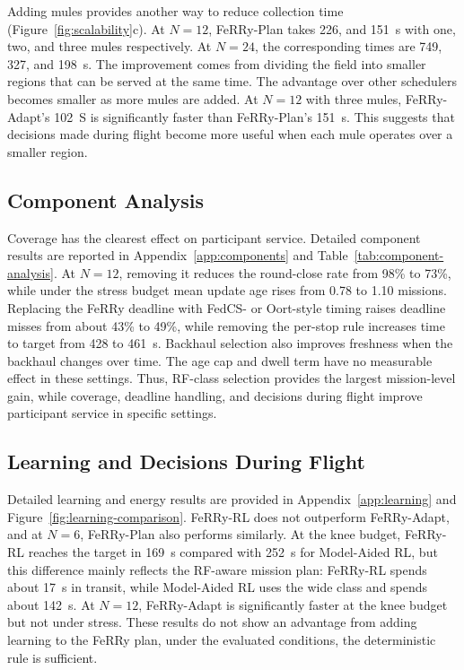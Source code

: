 \documentclass[conference]{IEEEtran}
\newcommand{\sysname}{FeRRy}
\begin{document}
Adding mules provides another way to reduce collection time
(Figure~\ref{fig:scalability}c). At \(N=12\), \sysname{}-Plan takes 226, and 151~s with one, two, and three mules respectively. At
\(N=24\), the corresponding times are 749, 327, and 198~s. The improvement
comes from dividing the field into smaller regions that can be served at the
same time. The advantage over other schedulers becomes smaller as more mules
are added. At \(N=12\) with three mules, \sysname{}-Adapt's 102~S is significantly
faster than \sysname{}-Plan's 151~s. This suggests that decisions made during
flight become more useful when each mule operates over a smaller region.

\subsection{Component Analysis}
\label{sec:components}

Coverage has the clearest
effect on participant service. Detailed component results are reported in
Appendix~\ref{app:components} and Table~\ref{tab:component-analysis}.
At \(N=12\), removing it reduces the round-close rate from 98\% to 73\%, while under
the stress budget mean update age rises from 0.78 to 1.10 missions.
Replacing the \sysname{} deadline with FedCS- or Oort-style timing raises
deadline misses from about 43\% to 49\%, while removing the per-stop rule
increases time to target from 428 to 461~s. Backhaul selection also improves
freshness when the backhaul changes over time. The age cap and dwell term have
no measurable effect in these settings. Thus, RF-class selection provides
the largest mission-level gain, while coverage, deadline handling, and
decisions during flight improve participant service in specific settings.

\subsection{Learning and Decisions During Flight}
\label{sec:learning}

Detailed learning and energy results are provided in
Appendix~\ref{app:learning} and Figure~\ref{fig:learning-comparison}.
\sysname{}-RL does not outperform \sysname{}-Adapt, and at \(N=6\),
\sysname{}-Plan also performs similarly. At the knee budget,
\sysname{}-RL reaches the target in 169~s compared with 252~s for
Model-Aided RL, but this difference mainly reflects the RF-aware mission plan:
\sysname{}-RL spends about 17~s in transit, while Model-Aided RL uses the wide
class and spends about 142~s. At \(N=12\), \sysname{}-Adapt is significantly
faster at the knee budget but not under stress. These results do not show an
advantage from adding learning to the \sysname{} plan, under the evaluated
conditions, the deterministic rule is sufficient.
\end{document}
